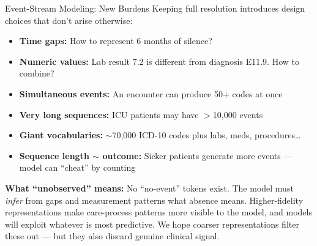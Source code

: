 \documentclass[aspectratio=169,10pt]{beamer}
\begin{document}
\begin{frame}{Event-Stream Modeling: New Burdens}
Keeping full resolution introduces design choices that don't arise otherwise:
\begin{itemize}[<+->]
    \item \textbf{Time gaps:} How to represent 6 months of silence?
    \item \textbf{Numeric values:} Lab result 7.2 is different from diagnosis E11.9. How to combine?
    \item \textbf{Simultaneous events:} An encounter can produce 50+ codes at once
    \item \textbf{Very long sequences:} ICU patients may have $>$10,000 events
    \item \textbf{Giant vocabularies:} $\sim$70,000 ICD-10 codes plus labs, meds, procedures\ldots
    \item \textbf{Sequence length $\sim$ outcome:} Sicker patients generate more events --- model can ``cheat'' by counting
\end{itemize}
\vspace{0.2em}
\textbf{What ``unobserved'' means:} No ``no-event'' tokens exist. The model must \emph{infer} from gaps and measurement patterns what absence means.
\alert{Higher-fidelity representations make care-process patterns more visible to the model, and models will exploit whatever is most predictive.} We hope coarser representations filter these out --- but they also discard genuine clinical signal.
\end{frame}

\end{document}
